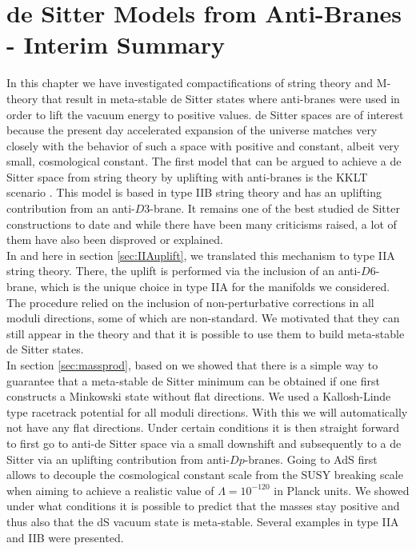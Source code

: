 \documentclass[a4paper,12pt,twoside,openright]{report}
\begin{document}
\section{de Sitter Models from Anti-Branes - Interim Summary}
In this chapter we have investigated compactifications of string theory and M-theory that result in meta-stable de Sitter states where anti-branes were used in order to lift the vacuum energy to positive values. de Sitter spaces are of interest because the present day accelerated expansion of the universe matches very closely with the behavior of such a space with positive and constant, albeit very small, cosmological constant. The first model that can be argued to achieve a de Sitter space from string theory by uplifting with anti-branes is the KKLT scenario \cite{Kachru:2003aw,Kachru:2003sx}. This model is based in type IIB string theory and has an uplifting contribution from an anti-$D3$-brane. It remains one of the best studied de Sitter constructions to date and while there have been many criticisms raised, a lot of them have also been disproved or explained.\\
In \cite{Cribiori:2019bfx} and here in section \ref{sec:IIAuplift}, we translated this mechanism to type IIA string theory. There, the uplift is performed via the inclusion of an anti-$D6$-brane, which is the unique choice in type IIA for the manifolds we considered. The procedure relied on the inclusion of non-perturbative corrections in all moduli directions, some of which are non-standard. We motivated that they can still appear in the theory and that it is possible to use them to build meta-stable de Sitter states.\\
In section \ref{sec:massprod}, based on \cite{Kallosh:2019zgd,Cribiori:2019drf} we showed that there is a simple way to guarantee that a meta-stable de Sitter minimum can be obtained if one first constructs a Minkowski state without flat directions. We used a Kallosh-Linde type racetrack potential for all moduli directions. With this we will automatically not have any flat directions. Under certain conditions it is then straight forward to first go to anti-de Sitter space via a small downshift and subsequently to a de Sitter via an uplifting contribution from anti-$Dp$-branes. Going to AdS first allows to decouple the cosmological constant scale from the SUSY breaking scale when aiming to achieve a realistic value of $\Lambda = 10^{-120}$ in Planck units. We showed under what conditions it is possible to predict that the masses stay positive and thus also that the dS vacuum state is meta-stable. Several examples in type IIA and IIB were presented.\\
\end{document}
